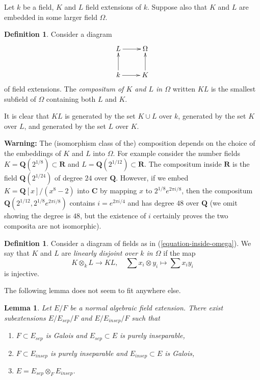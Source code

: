 \documentclass{stacks-project}
\theoremstyle{plain}
\newtheorem{lemma}[subsection]{Lemma}
\theoremstyle{definition}
\newtheorem{definition}[subsection]{Definition}
\theoremstyle{remark}
\numberwithin{equation}{subsection}
\begin{document}
\noindent
Let $k$ be a field, $K$ and $L$ field extensions of $k$.
Suppose also that $K$ and $L$ are embedded in some larger field $\Omega$.

\begin{definition}
\label{definition-compositum}
Consider a diagram
\begin{equation}
\label{equation-inside-omega}
\vcenter{
\xymatrix{
L \ar[r] & \Omega \\
k \ar[r] \ar[u] & K \ar[u]
}
}
\end{equation}
of field extensions. The {\it compositum of $K$ and $L$ in $\Omega$}
written $KL$ is the smallest subfield of $\Omega$ containing both
$L$ and $K$.
\end{definition}

\noindent
It is clear that $KL$ is generated by the set $K \cup L$ over $k$,
generated by the set $K$ over $L$, and generated by the set $L$ over $K$.

\medskip\noindent
{\bf Warning:} The (isomorphism class of the) composition depends on
the choice of the embeddings of $K$ and $L$ into $\Omega$. For example
consider the number fields $K = \mathbf{Q}(2^{1/8}) \subset \mathbf{R}$ and
$L = \mathbf{Q}(2^{1/12}) \subset \mathbf{R}$. The compositum inside
$\mathbf{R}$ is the field $\mathbf{Q}(2^{1/24})$ of degree $24$ over
$\mathbf{Q}$. However, if we embed $K = \mathbf{Q}[x]/(x^8 - 2)$ into
$\mathbf{C}$ by mapping $x$ to $2^{1/8}e^{2\pi i/8}$, then the compositum
$\mathbf{Q}(2^{1/12}, 2^{1/8}e^{2\pi i/8})$ contains $i = e^{2\pi i/4}$ and has
degree $48$ over $\mathbf{Q}$ (we omit showing the degree is $48$, but
the existence of $i$ certainly proves the two composita are not isomorphic).

\begin{definition}
\label{definition-linearly-disjoint}
Consider a diagram of fields as in (\ref{equation-inside-omega}).
We say that $K$ and $L$ are {\it linearly disjoint over $k$ in $\Omega$}
if the map
$$
K \otimes_k L \longrightarrow KL,\quad
\sum x_i \otimes y_i \longmapsto \sum x_i y_i
$$
is injective.
\end{definition}

\noindent
The following lemma does not seem to fit anywhere else.

\begin{lemma}
\label{lemma-normal-case}
Let $E/F$ be a normal algebraic field extension. There exist subextensions
$E / E_{sep} /F$ and $E / E_{insep} / F$ such that
\begin{enumerate}
\item $F \subset E_{sep}$ is Galois and $E_{sep} \subset E$
is purely inseparable,
\item $F \subset E_{insep}$ is purely inseparable and $E_{insep} \subset E$
is Galois,
\item $E = E_{sep} \otimes_F E_{insep}$.
\end{enumerate}
\end{lemma}
\end{document}
